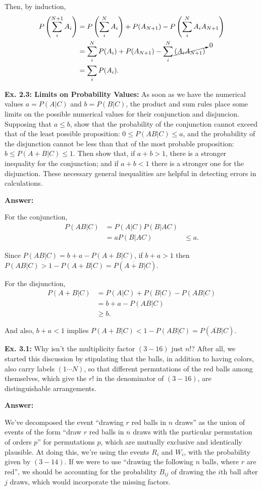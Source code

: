 \documentclass{article}
\begin{document}
Then, by induction,
\begin{align}
	P\left(\sum_i^{N+1}A_i\right)&=P\left(\sum_i^NA_i\right)+P(A_{N+1})-P\left(\sum_i^NA_iA_{N+1}\right)\\
	&=\sum_i^NP(A_i)+P(A_{N+1})-\sum_i^N\cancelto0{(A_iA_{N+1})}\\
	&=\sum_iP(A_i).
\end{align}

\textbf{Ex. 2.3: Limits on Probability Values: } As soon as we have the numerical values $a=P(A|C)$ and $b=P(B|C)$, the product and sum rules place some limits on the possible numerical values for their conjunction and disjuncion. Supposing that $a\leq b$, show that the probability of the conjunction cannot exceed that of the least possible proposition: $0\leq P(AB|C)\leq a$, and the probability of the disjunction cannot be less than that of the most probable proposition: $b\leq P(A+B|C)\leq 1$. Then show that, if $a+b>1$, there is a stronger inequality for the conjunction; and if $a+b<1$ there is a stronger one for the disjunction. These necessary general inequalities are helpful in detecting errors in calculations.

\textbf{Answer: }

For the conjunction,
\begin{align}
	P(AB|C)&=P(A|C)P(B|AC)\\
	&=aP(B|AC)
	&\leq a.
\end{align}

Since $P(AB|C)=b+a-P(A+B|C)$, if $b+a>1$ then $P(AB|C)>1-P(A+B|C)=P(\overline{A+B}|C)$.

For the disjunction,
\begin{align}
	P(A+B|C)&=P(A|C)+P(B|C)-P(AB|C)\\
	&=b+a-P(AB|C)\\
	&\geq b.
\end{align}

And also, $b+a<1$ implies $P(A+B|C)<1-P(AB|C)=P(\overline{AB}|C)$.

\textbf{Ex. 3.1: }Why isn't the multiplicity factor $(3-16)$ just $n!$? After all, we started this discussion by stipulating that the balls, in addition to having colors, also carry labels $(1\cdots N)$, so that different permutations of the red balls among themselves, which give the $r!$ in the denominator of $(3-16)$, are distinguishable arrangements.

\textbf{Answer: }

We've decomposed the event ``drawing $r$ red balls in $n$ draws'' as the union of events of the form ``draw $r$ red balls in $n$ draws with the particular permutation of orders $p$'' for permutations $p$, which are mutually exclusive and identically plausible. At doing this, we're using the events $R_i$ and $W_i$, with the probability given by $(3-14)$. If we were to use ``drawing the following $n$ balls, where $r$ are red'', we should be accounting for the probability $B_{ij}$ of drawing the $i$th ball after $j$ draws, which would incorporate the missing factors.
\end{document}
